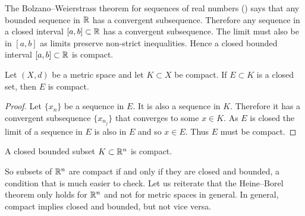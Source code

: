 \begin{example}
The Bolzano--Weierstrass theorem for sequences of real numbers
()
says that any bounded sequence in ${\mathbb{R}}$ has a convergent
subsequence.  Therefore any sequence in a closed interval $[a,b] \subset {\mathbb{R}}$ has 
a convergent subsequence.  The limit must also be in $[a,b]$ as limits
preserve non-strict inequalities.  Hence a closed bounded interval $[a,b]
\subset {\mathbb{R}}$ is compact.
\end{example}

\begin{prop}
Let $(X,d)$ be a metric space and let $K \subset X$ be compact.  If
$E \subset K$ is a closed set, then $E$ is compact.
\end{prop}

\begin{proof}
Let $\{ x_n \}$ be a sequence in $E$.  It is also a sequence in $K$.
Therefore it has a convergent subsequence $\{ x_{n_j} \}$ that converges to
some $x \in K$.  As $E$ is closed the limit of a sequence in $E$ is also in $E$
and so $x \in E$.  Thus $E$ must be compact.
\end{proof}

\begin{thm}%
\label{thm:msbw}
A closed bounded subset $K \subset {\mathbb{R}}^n$ is compact.
\end{thm}

So subsets of ${\mathbb{R}}^n$ are compact if and only if they are closed and bounded,
a condition that is much easier to check.
Let us reiterate that the Heine--Borel theorem only holds for ${\mathbb{R}}^n$ and not
for metric spaces in general.  In general, compact implies closed and
bounded, but not vice versa.

